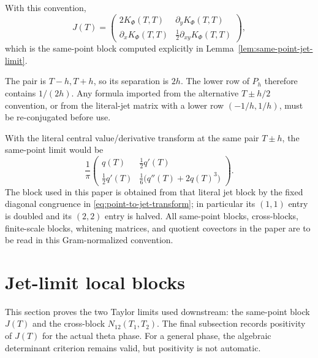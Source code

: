 With this convention,
\begin{equation}
\label{eq:same-point-as-kernel-derivatives}
J(T)=
\begin{pmatrix}
2K_\Phi(T,T)&\partial_yK_\Phi(T,T)\\[0.6ex]
\partial_xK_\Phi(T,T)&\tfrac12\partial_{xy}K_\Phi(T,T)
\end{pmatrix},
\end{equation}
which is the same-point block computed explicitly in
Lemma~\ref{lem:same-point-jet-limit}.

\begin{remark}
\label{rem:pair-separation-convention}
The pair is \(T-h,T+h\), so its separation is \(2h\).  The lower row of
\(P_h\) therefore contains \(1/(2h)\).  Any formula imported from the
alternative \(T\pm h/2\) convention, or from the literal-jet matrix with a
lower row \((-1/h,1/h)\), must be re-conjugated before use.
\end{remark}

\begin{remark}
\label{rem:normalization-audit}
With the literal central value/derivative transform at the same pair
\(T\pm h\), the same-point limit would be
\[
\frac1\pi
\begin{pmatrix}
q(T)&\tfrac12q'(T)\\[0.6ex]
\tfrac12q'(T)&\tfrac16\bigl(q''(T)+2q(T)^3\bigr)
\end{pmatrix}.
\]
The block used in this paper is obtained from that literal jet block by the
fixed diagonal congruence in \eqref{eq:point-to-jet-transform}; in particular
its \((1,1)\) entry is doubled and its \((2,2)\) entry is halved.  All
same-point blocks, cross-blocks, finite-scale blocks, whitening matrices, and
quotient covectors in the paper are to be read in this Gram-normalized
convention.
\end{remark}

\section{Jet-limit local blocks}
\label{sec:jet-limit-local-blocks}
\quad
{}\quad
{}\quad
{}\quad
{}\quad
{}
\par\medskip

This section proves the two Taylor limits used downstream: the same-point
block \(J(T)\) and the cross-block \(N_{12}(T_1,T_2)\).  The final subsection
records positivity of \(J(T)\) for the actual theta phase.  For a general
phase, the algebraic determinant criterion remains valid, but positivity is
not automatic.

